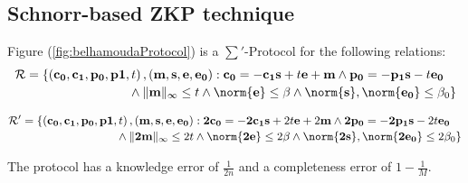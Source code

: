 \subsection{Schnorr-based ZKP technique}
\label{sec:zero-knowledge-proof}

\begin{theorem}
  Figure (\ref{fig:belhamoudaProtocol}) is a $\sum'$-Protocol for the following
  relations:
  \begin{equation}
    \label{equ:zkp_relation1}
    \begin{multlined}
      \mathcal{R} = \{ \left( \mathbf{c_0,c_1,p_0,p1},t \right), (\mathbf{m,
        s, e, e_0}): \mathbf{c_0 = -c_1s} + t\mathbf{e} +
      \mathbf{m}
      \wedge \mathbf{p_0 = -p_1s} - t\mathbf{e_{0}} \\
      \wedge \norminf{\mathbf{m}} \leq t
      \wedge \norm{\mathbf{e}} \leq \beta \wedge
      \norm{\mathbf{s}},\norm{\mathbf{e_0}} \leq \beta_0 \}
    \end{multlined}
  \end{equation}

  \begin{equation}
    \label{eq:zkp_relation2}
    \begin{multlined}
      \mathcal{R'} = \{ \left( \mathbf{c_0,c_1,p_0,p1},t \right), (\mathbf{m,
        s, e, e_0}): \mathbf{2c_0 = -2c_1s} + 2t\mathbf{e} + 2\mathbf{m} \wedge
      \mathbf{2p_0 = -2p_1s} - 2t\mathbf{e_{0}} \\
      \wedge
      \norminf{\mathbf{2m}} \leq 2t
      \wedge \norm{\mathbf{2e}} \leq 2\beta \wedge
      \norm{\mathbf{2s}},\norm{\mathbf{2e_0}} \leq 2\beta_0 \}
    \end{multlined}
  \end{equation}


  The protocol has a knowledge error of $\frac{1}{2n}$ and a completeness
  error of $1 - \frac{1}{M}$.

  \label{theo:BVZKPBenhamouda}
\end{theorem}

